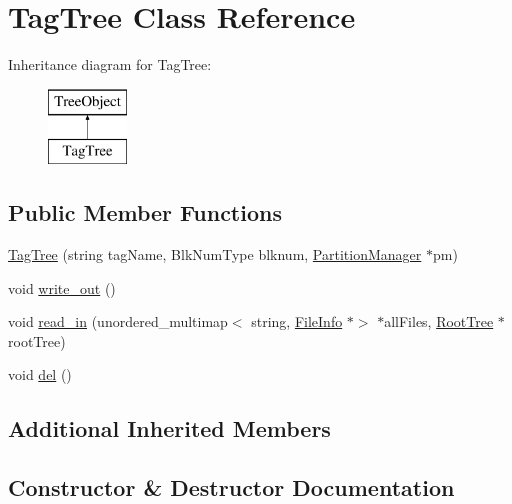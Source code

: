 \hypertarget{classTagTree}{}\section{Tag\+Tree Class Reference}
\label{classTagTree}
Inheritance diagram for Tag\+Tree\+:\begin{figure}[H]
\begin{center}
\leavevmode
\includegraphics[height=2.000000cm]{df/da0/classTagTree}
\end{center}
\end{figure}
\subsection*{Public Member Functions}
\begin{DoxyCompactItemize}
\item 
\mbox{\hyperlink{classTagTree_a80b23fa47a18727a248c3db1e8b2ed83}{Tag\+Tree}} (string tag\+Name, Blk\+Num\+Type blknum, \mbox{\hyperlink{classPartitionManager}{Partition\+Manager}} $\ast$pm)
\item 
void \mbox{\hyperlink{classTagTree_adf13e01b25991ecfef1ad958e02c07fe}{write\+\_\+out}} ()
\item 
void \mbox{\hyperlink{classTagTree_af86ee6713fa03c3909e04608512b8b62}{read\+\_\+in}} (unordered\+\_\+multimap$<$ string, \mbox{\hyperlink{classFileInfo}{File\+Info}} $\ast$$>$ $\ast$all\+Files, \mbox{\hyperlink{classRootTree}{Root\+Tree}} $\ast$root\+Tree)
\item 
void \mbox{\hyperlink{classTagTree_ad8108969f4d28b938e55c8339f19db35}{del}} ()
\end{DoxyCompactItemize}
\subsection*{Additional Inherited Members}


\subsection{Constructor \& Destructor Documentation}
\mbox{\label{classTagTree_a80b23fa47a18727a248c3db1e8b2ed83}} 
